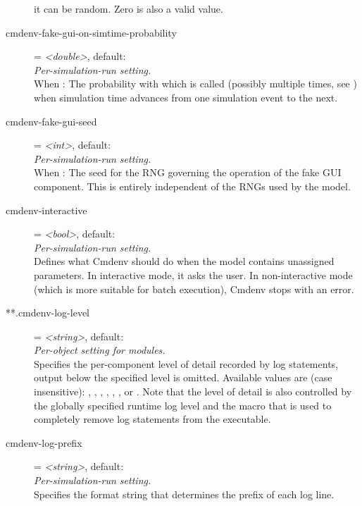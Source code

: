 \begin{description}
    it can be random. Zero is also a valid value.
\item[cmdenv-fake-gui-on-simtime-probability] = \textit{<double>}, default: \\
    \textit{Per-simulation-run setting.}\\
    When : The
    probability with which  is called (possibly
    multiple times, see
    )
    when simulation time advances from one simulation event to the next.
\item[cmdenv-fake-gui-seed] = \textit{<int>}, default: \\
    \textit{Per-simulation-run setting.}\\
    When : The
    seed for the RNG governing the operation of the fake GUI component. This is
    entirely independent of the RNGs used by the model.
\item[cmdenv-interactive] = \textit{<bool>}, default: \\
    \textit{Per-simulation-run setting.}\\
    Defines what Cmdenv should do when the model contains unassigned
    parameters. In interactive mode, it asks the user. In non-interactive mode
    (which is more suitable for batch execution), Cmdenv stops with an error.
\item[**.cmdenv-log-level] = \textit{<string>}, default: \\
    \textit{Per-object setting for modules.}\\
    Specifies the per-component level of detail recorded by log statements,
    output below the specified level is omitted. Available values are (case
    insensitive): , , , , ,
    ,  or . Note that the level of detail is
    also controlled by the globally specified runtime log level and the
     macro that is used to completely remove log
    statements from the executable.
\item[cmdenv-log-prefix] = \textit{<string>}, default: \ttt{[\%l]	}\\
    \textit{Per-simulation-run setting.}\\
    Specifies the format string that determines the prefix of each log line.

\end{description}
